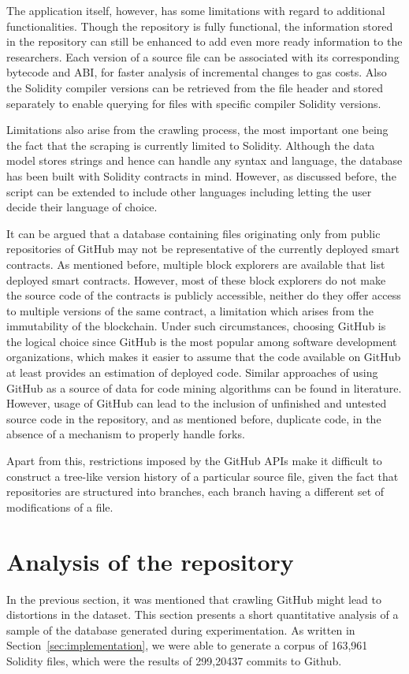 \documentclass[10pt,conference]{IEEEtran}
\begin{document}
	The application itself, however, has some limitations with regard to additional functionalities. Though the repository is fully functional, the information stored in the repository can still be enhanced to add even more ready information to the researchers. Each version of a source file can be associated with its corresponding bytecode and ABI, for faster analysis of incremental changes to gas costs. Also the Solidity compiler versions can be retrieved from the file header and stored separately to enable querying for files with specific compiler Solidity versions.
	
	Limitations also arise from the crawling process, the most important one being the fact that the scraping is currently limited to Solidity. Although the data model stores strings and hence can handle any syntax and language, the database has been built with Solidity contracts in mind. However, as discussed before, the script can be extended to include other languages including letting the user decide their language of choice.
	
	It can be argued that a database containing files originating only from public repositories of GitHub may not be representative of the currently deployed smart contracts. As mentioned before, multiple block explorers are available that list deployed smart contracts. However, most of these block explorers do not make the source code of the contracts is publicly accessible, neither do they offer access to multiple versions of the same contract, a limitation which arises from the immutability of the blockchain. Under such circumstances, choosing GitHub is the logical choice since GitHub is the most popular among software development organizations, which makes it easier to assume that the code available on GitHub at least provides an estimation of deployed code. Similar approaches of using GitHub as a source of data for code mining algorithms can be found in literature\cite{schroder, dabic, yang}. However, usage of GitHub can lead to the inclusion of unfinished and untested source code in the repository, and as mentioned before, duplicate code, in the absence of a mechanism to properly handle forks. 
	
	Apart from this, restrictions imposed by the GitHub APIs make it difficult to construct a tree-like version history of a particular source file, given the fact that repositories are structured into branches, each branch having a different set of modifications of a file. 
	
	\section{Analysis of the repository}
	In the previous section, it was mentioned that crawling GitHub might lead to distortions in the dataset. This section presents a short quantitative analysis of a sample of the database generated during experimentation. As written in Section~\ref{sec:implementation}, we were able to generate a corpus of 163,961 Solidity files, which were the results of 299,20437 commits to Github.
	
\end{document}
